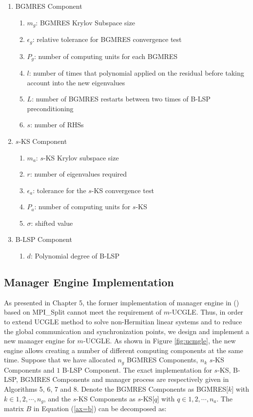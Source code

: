 \begin{enumerate}
	\item BGMRES Component
	\begin{enumerate}
		\item $m_g$: BGMRES Krylov Subspace size
		\item $\epsilon_g$: relative tolerance for BGMRES convergence test
		\item $P_g$: number of computing units for each BGMRES
		\item $l$: number of times that polynomial applied on the residual before taking account into the new eigenvalues
		\item $L$: number of BGMRES restarts between two times of B-LSP preconditioning
		\item $s$: number of RHSs
	\end{enumerate}
	\item $s$-KS Component
	\begin{enumerate}
		\item $m_a$: $s$-KS Krylov subspace size
		\item $r$: number of eigenvalues required
		\item $\epsilon_a$: tolerance for the $s$-KS convergence test
		\item $P_a$: number of computing units for $s$-KS
		\item  $\sigma$: shifted value
	\end{enumerate}
	\item B-LSP Component
	\begin{enumerate}
		\item $d$: Polynomial degree of B-LSP
	\end{enumerate}
\end{enumerate}

\subsection{Manager Engine Implementation}\label{engineimpl}

As presented in Chapter 5, the former implementation of manager engine in (\cite{wu2018distributed}) based on MPI\_Split cannot meet the requirement of $m$-UCGLE. Thus, in order to extend UCGLE method to solve non-Hermitian linear systems and to reduce the global communication and synchronization points, we design and implement a new manager engine for $m$-UCGLE. As shown in Figure \ref{fig:ucmgle}, the new engine allows creating a number of different computing components at the same time. Suppose that we have allocated $n_g$ BGMRES Components, $n_k$ $s$-KS Components and $1$ B-LSP Component. The exact implementation for $s$-KS, B-LSP, BGMRES Components and manager process are respectively given in Algorithms 5, 6, 7 and 8. Denote the BGMRES Components as BGMRES[$k$] with $k \in 1, 2, \cdots, n_g$, and the $s$-KS Components as $s$-KS[$q$] with $q \in 1, 2, \cdots, n_a$.   The matrix $B$ in Equation (\ref{ax=b}) can be decomposed as:

